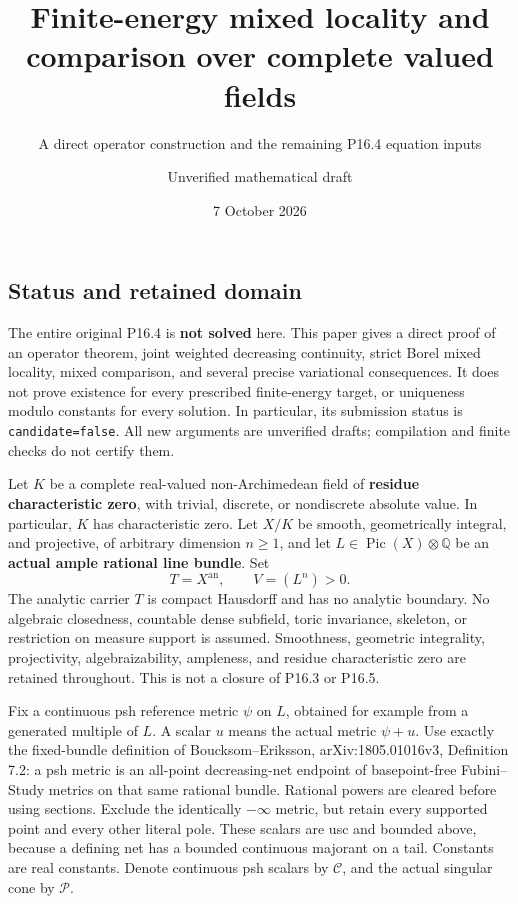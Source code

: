 \documentclass[
]{article}
\title{Finite-energy mixed locality and comparison over complete valued
fields}
\subtitle{A direct operator construction and the remaining P16.4
equation inputs}
\author{Unverified mathematical draft}
\date{7 October 2026}
\begin{document}
\maketitle

\subsection{Status and retained
domain}\label{status-and-retained-domain}

The entire original P16.4 is \textbf{not solved} here. This paper gives
a direct proof of an operator theorem, joint weighted decreasing
continuity, strict Borel mixed locality, mixed comparison, and several
precise variational consequences. It does not prove existence for every
prescribed finite-energy target, or uniqueness modulo constants for
every solution. In particular, its submission status is
\texttt{candidate=false}. All new arguments are unverified drafts;
compilation and finite checks do not certify them.

Let \(K\) be a complete real-valued non-Archimedean field of
\textbf{residue characteristic zero}, with trivial, discrete, or
nondiscrete absolute value. In particular, \(K\) has characteristic
zero. Let \(X/K\) be smooth, geometrically integral, and projective, of
arbitrary dimension \(n\geq1\), and let
\(L\in\operatorname{Pic}(X)\otimes\mathbb Q\) be an \textbf{actual ample
rational line bundle}. Set \[
T=X^{\mathrm{an}},\qquad V=(L^n)>0.
\] The analytic carrier \(T\) is compact Hausdorff and has no analytic
boundary. No algebraic closedness, countable dense subfield, toric
invariance, skeleton, or restriction on measure support is assumed.
Smoothness, geometric integrality, projectivity, algebraizability,
ampleness, and residue characteristic zero are retained throughout. This
is not a closure of P16.3 or P16.5.

Fix a continuous psh reference metric \(\psi\) on \(L\), obtained for
example from a generated multiple of \(L\). A scalar \(u\) means the
actual metric \(\psi+u\). Use exactly the fixed-bundle definition of
Boucksom--Eriksson, arXiv:1805.01016v3, Definition 7.2: a psh metric is
an all-point decreasing-net endpoint of basepoint-free Fubini--Study
metrics on that same rational bundle. Rational powers are cleared before
using sections. Exclude the identically \(-\infty\) metric, but retain
every supported point and every other literal pole. These scalars are
usc and bounded above, because a defining net has a bounded continuous
majorant on a tail. Constants are real constants. Denote continuous psh
scalars by \(\mathcal C\), and the actual singular cone by
\(\mathcal P\).
\end{document}
